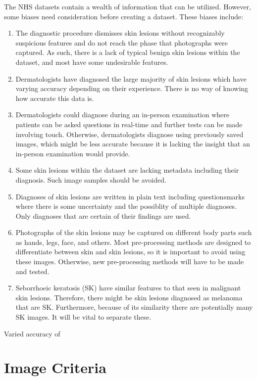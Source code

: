 The NHS datasets contain a wealth of information that can be utilized. However, some biases need consideration before creating a dataset. These biases include:
\begin{enumerate}
    \item  The diagnostic procedure dismisses skin lesions without recognizably suspicious features and do not reach the phase that photographs were captured. As such, there is a lack of typical benign skin lesions within the dataset, and most have some undesirable features.
    \item Dermatologists have diagnosed the large majority of skin lesions which have varying accuracy depending on their experience. There is no way of knowing how accurate this data is.
    \item Dermatologists could diagnose during an in-person examination where patients can be asked questions in real-time and further tests can be made involving touch. Otherwise, dermatologists diagnose using previously saved images, which might be less accurate because it is lacking the insight that an in-person examination would provide.
    \item Some skin lesions within the dataset are lacking metadata including their diagnosis. Such image samples should be avoided.
    \item Diagnoses of skin lesions are written in plain text including questionsmarks where there is some uncertainty and the possiblity of multiple diagnoses. Only diagnoses that are certain of their findings are used.
    \item Photographs of the skin lesions may be captured on different body parts such as hands, legs, face, and others. Most pre-processing methods are designed to differentiate between skin and skin lesions, so it is important to avoid using these images. Otherwise, new pre-processing methods will have to be made and tested.
    \item Seborrhoeic keratosis (SK) have similar features to that seen in malignant skin lesions. Therefore, there might be skin lesions diagnosed as melanoma that are SK. Furthermore, because of its similarity there are potentially many SK images. It will be vital to separate these.
\end{enumerate}

Varied accuracy of

\section{Image Criteria}

